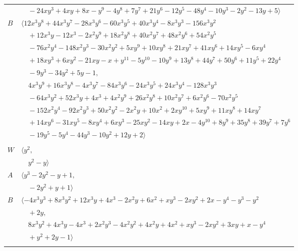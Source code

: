 \documentclass[11pt]{article}
\begin{document}
\begin{longtable}{@{}ll@{}}
 & $\quad -24xy^{3}+4xy+8x-y^{9}-4y^{8}+7y^{7}+21y^{6}-12y^{5}-48y^{4}-10y^{3}-2y^{2}-13y+5\rangle$\\
$B$ & $\langle 12x^{3}y^{8}+44x^{3}y^{7}-28x^{3}y^{6}-60x^{3}y^{5}+40x^{3}y^{4}-8x^{3}y^{3}-156x^{3}y^{2}$\\
 & $\quad +12x^{3}y-12x^{3}-2x^{2}y^{9}+18x^{2}y^{8}+40x^{2}y^{7}+48x^{2}y^{6}+54x^{2}y^{5}$\\
 & $\quad -76x^{2}y^{4}-148x^{2}y^{3}-30x^{2}y^{2}+5xy^{9}+10xy^{8}+21xy^{7}+41xy^{6}+14xy^{5}-6xy^{4}$\\
 & $\quad +18xy^{3}+6xy^{2}-21xy-x+y^{11}-5y^{10}-10y^{9}+13y^{8}+44y^{7}+50y^{6}+11y^{5}+22y^{4}$\\
 & $\quad -9y^{3}-34y^{2}+5y-1,$\\
 & $\quad 4x^{3}y^{9}+16x^{3}y^{8}-4x^{3}y^{7}-84x^{3}y^{6}-24x^{3}y^{5}+24x^{3}y^{4}-128x^{3}y^{3}$\\
 & $\quad -64x^{3}y^{2}+52x^{3}y+4x^{3}+4x^{2}y^{9}+26x^{2}y^{8}+10x^{2}y^{7}+6x^{2}y^{6}-70x^{2}y^{5}$\\
 & $\quad -152x^{2}y^{4}-92x^{2}y^{3}+50x^{2}y^{2}-2x^{2}y+10x^{2}+2xy^{10}+5xy^{9}+11xy^{8}+14xy^{7}$\\
 & $\quad +14xy^{6}-31xy^{5}-8xy^{4}+6xy^{3}-25xy^{2}-14xy+2x-4y^{10}+8y^{9}+35y^{8}+39y^{7}+7y^{6}$\\
 & $\quad -19y^{5}-5y^{4}-44y^{3}-10y^{2}+12y+2\rangle$\\
\addlinespace[2pt]
\multicolumn{2}{@{}p{0.97\textwidth}@{}}{$i=5$, $D_i=1$, $\rho_{ij}$: $1{:}1, \allowbreak 11{:}1, \allowbreak 12{:}1, \allowbreak 21{:}2$}\\
$W$ & $\langle y^{2},$\\
 & $\quad y^{2}-y\rangle$\\
$A$ & $\langle y^{3}-2y^{2}-y+1,$\\
 & $\quad -2y^{2}+y+1\rangle$\\
$B$ & $\langle -4x^{3}y^{3}+8x^{3}y^{2}+12x^{3}y+4x^{3}-2x^{2}y+6x^{2}+xy^{3}-2xy^{2}+2x-y^{4}-y^{3}-y^{2}$\\
 & $\quad +2y,$\\
 & $\quad 8x^{3}y^{2}+4x^{3}y-4x^{3}+2x^{2}y^{3}-4x^{2}y^{2}+4x^{2}y+4x^{2}+xy^{3}-2xy^{2}+3xy+x-y^{4}$\\
 & $\quad +y^{2}+2y-1\rangle$\\
\addlinespace[2pt]
\multicolumn{2}{@{}p{0.97\textwidth}@{}}{$i=6$, $D_i=1$, $\rho_{ij}$: $1{:}2, \allowbreak 2{:}1, \allowbreak 10{:}2, \allowbreak 11{:}1, \allowbreak 13{:}2, \allowbreak 14{:}1, \allowbreak 16{:}1, \allowbreak 19{:}1, \allowbreak 20{:}1$}\\

\end{longtable}
\end{document}

